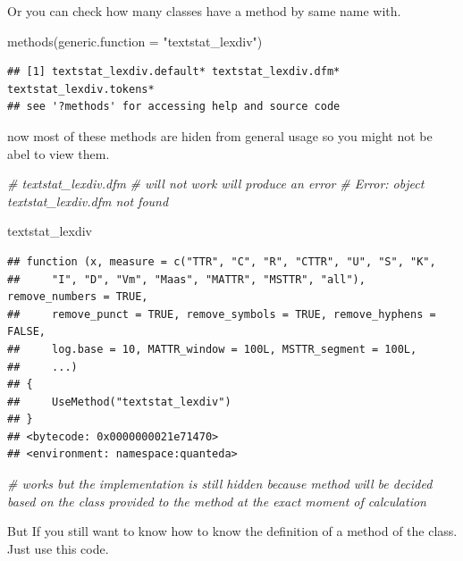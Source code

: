\documentclass[
]{book}
\newenvironment{Shaded}{\begin{snugshade}}{\end{snugshade}}
\newcommand{\AttributeTok}[1]{\textcolor[rgb]{0.77,0.63,0.00}{#1}}
\newcommand{\CommentTok}[1]{\textcolor[rgb]{0.56,0.35,0.01}{\textit{#1}}}
\newcommand{\FunctionTok}[1]{\textcolor[rgb]{0.00,0.00,0.00}{#1}}
\newcommand{\NormalTok}[1]{#1}
\newcommand{\StringTok}[1]{\textcolor[rgb]{0.31,0.60,0.02}{#1}}
\begin{document}
Or you can check how many classes have a method by same name with.

\begin{Shaded}
\begin{Highlighting}[]
\FunctionTok{methods}\NormalTok{(}\AttributeTok{generic.function =} \StringTok{"textstat\_lexdiv"}\NormalTok{)}
\end{Highlighting}
\end{Shaded}

\begin{verbatim}
## [1] textstat_lexdiv.default* textstat_lexdiv.dfm*     textstat_lexdiv.tokens* 
## see '?methods' for accessing help and source code
\end{verbatim}

now most of these methods are hiden from general usage so you might not be abel to view them.

\begin{Shaded}
\begin{Highlighting}[]
\CommentTok{\# textstat\_lexdiv.dfm }
\CommentTok{\# will not work will produce an error}
\CommentTok{\# Error: object \textquotesingle{}textstat\_lexdiv.dfm\textquotesingle{} not found}

\NormalTok{textstat\_lexdiv}
\end{Highlighting}
\end{Shaded}

\begin{verbatim}
## function (x, measure = c("TTR", "C", "R", "CTTR", "U", "S", "K", 
##     "I", "D", "Vm", "Maas", "MATTR", "MSTTR", "all"), remove_numbers = TRUE, 
##     remove_punct = TRUE, remove_symbols = TRUE, remove_hyphens = FALSE, 
##     log.base = 10, MATTR_window = 100L, MSTTR_segment = 100L, 
##     ...) 
## {
##     UseMethod("textstat_lexdiv")
## }
## <bytecode: 0x0000000021e71470>
## <environment: namespace:quanteda>
\end{verbatim}

\begin{Shaded}
\begin{Highlighting}[]
\CommentTok{\# works but the implementation is still hidden because method will be decided based on the class provided to the method at the exact moment of calculation}
\end{Highlighting}
\end{Shaded}

But If you still want to know how to know the definition of a method of the class. Just use this code.
\end{document}
